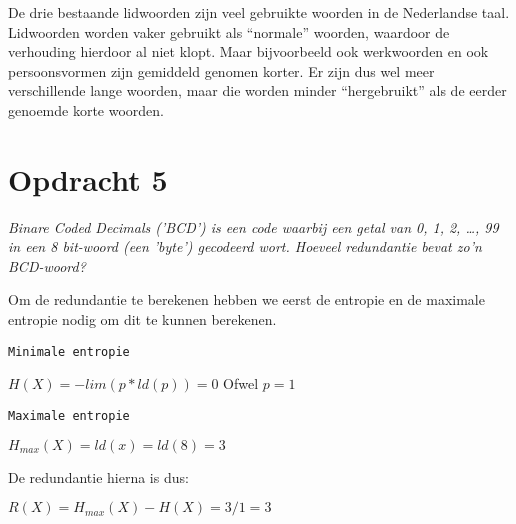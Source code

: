 De drie bestaande lidwoorden zijn veel gebruikte woorden in de Nederlandse taal. Lidwoorden worden vaker gebruikt als ``normale'' woorden, waardoor de verhouding hierdoor al niet klopt. Maar bijvoorbeeld ook werkwoorden en ook persoonsvormen zijn gemiddeld genomen korter. Er zijn dus wel meer verschillende lange woorden, maar die worden minder ``hergebruikt'' als de eerder genoemde korte woorden. 

\section{Opdracht 5}
\emph{Binare Coded Decimals ('BCD') is een code waarbij een getal van 0, 1, 2, \ldots, 99 in een 8 bit-woord (een '\emph{byte}') gecodeerd wort. Hoeveel redundantie bevat zo'n BCD-woord?}

Om de redundantie te berekenen hebben we eerst de entropie en de maximale entropie nodig om dit te kunnen berekenen.

\texttt{Minimale entropie}

$H(X)=-lim(p*ld(p))=0$
Ofwel
$p=1$

\texttt{Maximale entropie}

$H_{max}(X)=ld(x)=ld(8)=3$

De redundantie hierna is dus:

$R(X)=H_{max}(X)-H(X)=3/1=3$
